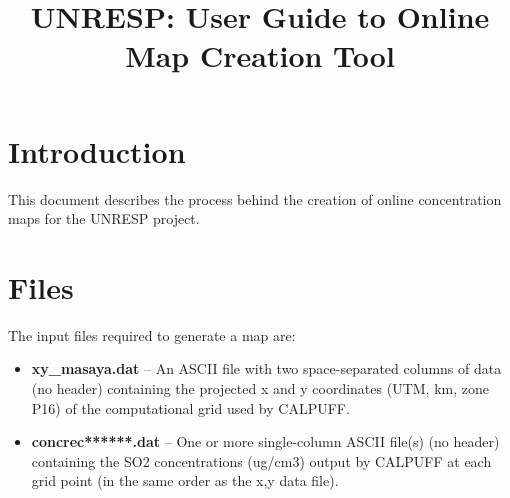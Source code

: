\documentclass[10pt,a4paper]{article}
\title{UNRESP: User Guide to Online Map Creation Tool}
\begin{document}
\maketitle
\tableofcontents

\section{Introduction}
This document describes the process behind the creation of online concentration maps for the UNRESP project.

\section{Files}
The input files required to generate a map are:
\begin{itemize}
\item \textbf{xy\_masaya.dat} -- An ASCII file with two space-separated columns of data (no header) containing the projected x and y coordinates (UTM, km, zone P16) of the computational grid used by CALPUFF.
\item \textbf{concrec******.dat} -- One or more single-column ASCII file(s) (no header) containing the SO2 concentrations (ug/cm3) output by CALPUFF at each grid point (in the same order as the x,y data file).
\end{itemize}
\end{document}
